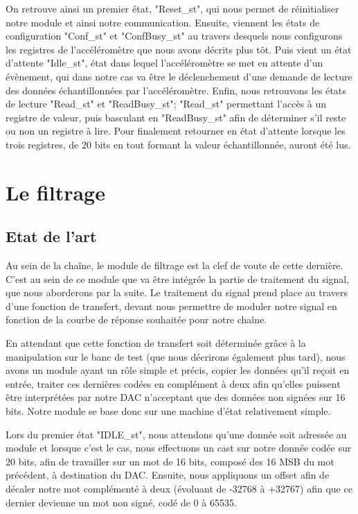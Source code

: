 \documentclass[french,a4paper,12pt]{report}
\begin{document}
			On retrouve ainsi un premier état, "Reset\_st", qui nous permet de réinitialiser notre module et ainsi notre communication. Ensuite, viennent les états de configuration "Conf\_st" et "ConfBusy\_st" au travers desquels nous configurons les registres de l'accéléromètre que nous avons décrits plus tôt. Puis vient un état d'attente "Idle\_st", état dans lequel l'accéléromètre se met en attente d'un évènement, qui dans notre cas va être le déclenchement d'une demande de lecture des données échantillonnées par l'accéléromètre. Enfin, nous retrouvons les états de lecture "Read\_st" et "ReadBusy\_st"; "Read\_st" permettant l'accès à un registre de valeur, puis basculant en "ReadBusy\_st" afin de déterminer s'il reste ou non un registre à lire. Pour finalement retourner en état d'attente lorsque les trois registres, de 20 bits en tout formant la valeur échantillonnée, auront été lus.		
	
	\chapter{Le filtrage}
	
	\section{Etat de l'art}
	Au sein de la chaîne, le module de filtrage est la clef de voute de cette dernière. C'est au sein de ce module que va être intégrée la partie de traitement du signal, que nous aborderons par la suite. Le traitement du signal prend place au travers d'une fonction de transfert, devant nous permettre de moduler notre signal en fonction de la courbe de réponse souhaitée pour notre chaîne.
	
	En attendant que cette fonction de transfert soit déterminée grâce à la manipulation sur le banc de test (que nous décrirons également plus tard), nous avons un module ayant un rôle simple et précis, copier les données qu'il reçoit en entrée, traiter ces dernières codées en complément à deux afin qu'elles puissent être interprétées par notre DAC n'acceptant que des données non signées sur 16 bits. Notre module se base donc sur une machine d'état relativement simple.
	
	Lors du premier état "IDLE\_st", nous attendons qu'une donnée soit adressée au module et lorsque c'est le cas, nous effectuons un cast sur notre donnée codée sur 20 bits, afin de travailler sur un mot de 16 bits, composé des 16 MSB du mot précédent, à destination du DAC. Ensuite, nous appliquons un offset afin de décaler notre mot complémenté à deux (évoluant de -32768 à +32767) afin que ce dernier devienne un mot non signé, codé de 0 à 65535.
	
\end{document}

